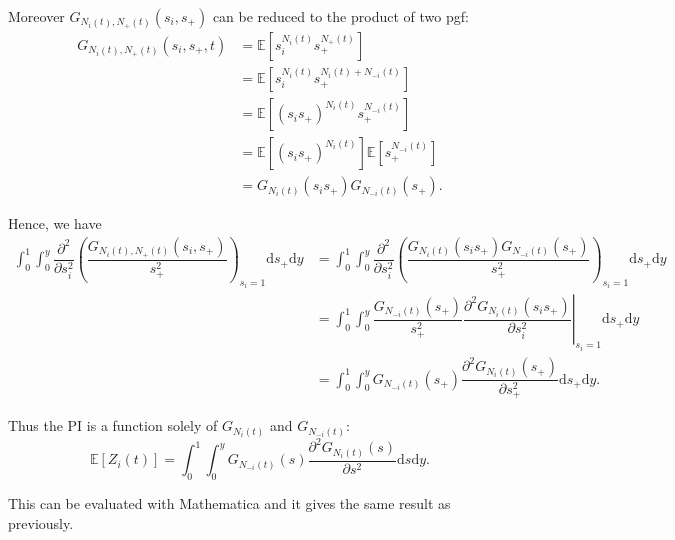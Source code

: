 \documentclass{article}
\newcommand{\ud}{{\mathrm{d}}}
\begin{document}
 Moreover $G_{N_i(t) ,N_+(t)}(s_i,s_+)$ can be reduced to the product of two pgf: 
  \begin{align}
G_{N_i(t) ,N_+(t)}(s_i,s_+,t) &= \mathbb{E} [ s_i^{N_i(t)} s_+^{N_+(t)}] \\
		&= \mathbb{E} [ s_i^{N_i(t)} s_+^{N_i(t)+N_{-i}(t)}]\\
		&= \mathbb{E} [ (s_i s_+)^{N_i(t)} s_+^{N_{-i}(t)}] \\
		&= \mathbb{E} [ (s_i s_+)^{N_i(t)} ]\mathbb{E} [ s_+^{N_{-i}(t)}] \\
		&= G_{N_i(t)}(s_i s_+) G_{N_{-i}(t)}(s_+).
 \end{align}
 
 Hence, we have 
   \begin{align}
\displaystyle \int_0^1 \int_0^y \dfrac{\partial^2 }{\partial s_i^2} \left( \dfrac{G_{N_i(t) ,N_+(t)}(s_i,s_+)}{s_+^2} \right)_{s_i =1} \ud s_+ \ud y
 &= \int_0^1 \int_0^y \dfrac{\partial^2 }{\partial s_i^2} \left( \dfrac{ G_{N_i(t)}(s_i s_+) G_{N_{-i}(t)}(s_+)}{s_+^2} \right)_{s_i =1} \ud s_+ \ud y \\
  &= \int_0^1 \int_0^y \dfrac{G_{N_{-i}(t)}(s_+)}{s_+^2} \left. \dfrac{\partial^2  G_{N_i(t)}(s_i s_+)  }{\partial s_i^2} \right\vert_{s_i =1} \ud s_+ \ud y \\
    &= \int_0^1 \int_0^y G_{N_{-i}(t)}(s_+) \dfrac{\partial^2  G_{N_i(t)}(s_+)  }{\partial s_+^2} \ud s_+ \ud y.
 \end{align}
 
 Thus the PI is a function solely of $G_{N_{i}(t)}$ and $G_{N_{-i}(t)}$:
 \begin{equation}
 \displaystyle \mathbb{E}\left[ Z_i(t) \right]= \int_0^1 \int_0^y G_{N_{-i}(t)}(s) \dfrac{\partial^2 G_{N_i(t)}(s)}{\partial s^2} \ud s \ud y.
 \end{equation}

This can be evaluated with Mathematica and it gives the same result as previously.




\end{document}
